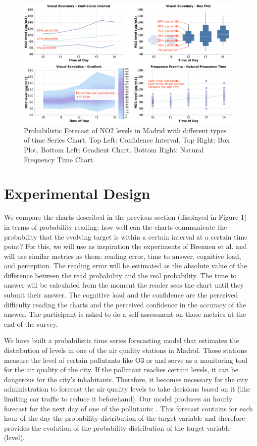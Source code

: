 \documentclass[a4paper,3p,sort&compress]{elsarticle}
\begin{document}
\begin{figure}
  \centering
  \includegraphics[width=.9\textwidth]{charts_vector} 
  \caption{\label{figure:charts} Probabilistic Forecast of NO2 levels in Madrid with different types of time Series Chart. 
  Top Left: Confidence Interval. Top Right: Box Plot. 
  Bottom Left: Gradient Chart. Bottom Right: Natural Frequency Time Chart. }
\end{figure} 

\section{Experimental Design}
\label{sec:exp_design}

We compare the charts described in the previous section (displayed in Figure 1) 
in terms of probability 
reading: how well 
can the charts communicate the probability that the evolving target is within a certain interval 
at a certain time point?
 For this, we will use as inspiration the experiments of Brennen et al. \cite{brennen_instrument_2018}
and will use similar metrics 
as them: reading error, time to answer, cognitive load, and perception. The reading error will be estimated as the 
absolute value of the difference between the read probability and the real probability. The time to answer 
will be calculated from the moment the reader sees the chart until they submit their answer. The cognitive 
load and the confidence are the perceived difficulty reading the charts and the perceived confidence in 
the accuracy of 
the answer. The participant is asked to do a self-assessment on those metrics at the end of the survey.

We have built a probabilistic time series forecasting model that estimates the distribution of \no 
levels in one of the air quality stations in Madrid. Those stations measure the level of certain 
pollutants like O3 or \no and serve as a monitoring tool for the air quality of the city. If the pollutant 
reaches certain levels, it can be dangerous for the city's inhabitants. Therefore, it becomes necessary 
for the city administration to 
forecast the air quality levels to take decisions based on it (like limiting car traffic to reduce it beforehand).
Our model produces an hourly forecast for the next day of one of the pollutants: \no. This forecast contains
for each hour of the day the probability distribution of the target variable and therefore provides the evolution 
of the probability distribution of the target variable (\no level).
\end{document}
